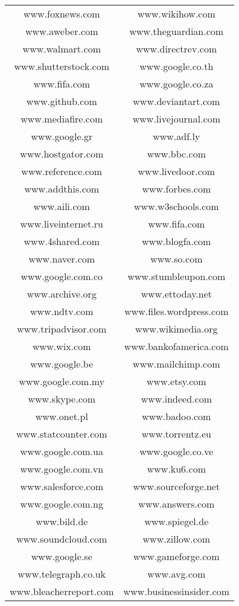 \begin{longtable}{c c}
www.foxnews.com & www.wikihow.com \\
www.aweber.com & www.theguardian.com \\
www.walmart.com & www.directrev.com \\
www.shutterstock.com & www.google.co.th \\
www.fifa.com & www.google.co.za \\
www.github.com & www.deviantart.com \\
www.mediafire.com & www.livejournal.com \\
www.google.gr & www.adf.ly \\
www.hostgator.com & www.bbc.com \\
www.reference.com & www.livedoor.com \\
www.addthis.com & www.forbes.com \\
www.aili.com & www.w3schools.com \\
www.liveinternet.ru & www.fifa.com \\
www.4shared.com & www.blogfa.com \\
www.naver.com & www.so.com \\
www.google.com.co & www.stumbleupon.com \\
www.archive.org & www.ettoday.net \\
www.ndtv.com & www.files.wordpress.com \\
www.tripadvisor.com & www.wikimedia.org \\
www.wix.com & www.bankofamerica.com \\
www.google.be & www.mailchimp.com \\
www.google.com.my & www.etsy.com \\
www.skype.com & www.indeed.com \\
www.onet.pl & www.badoo.com \\
www.statcounter.com & www.torrentz.eu \\
www.google.com.ua & www.google.co.ve \\
www.google.com.vn & www.ku6.com \\
www.salesforce.com & www.sourceforge.net \\
www.google.com.ng & www.answers.com \\
www.bild.de & www.spiegel.de \\
www.soundcloud.com & www.zillow.com \\
www.google.se & www.gameforge.com \\
www.telegraph.co.uk & www.avg.com \\
www.bleacherreport.com & www.businessinsider.com \\

\end{longtable}
